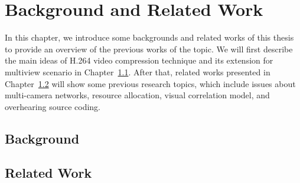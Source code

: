 \section{Background and Related Work}
\label{sec::backgroundAndRelatedWork}
In this chapter, we introduce some backgrounds and related works of this thesis to provide an overview of the previous works of the topic.
We will first describe the main ideas of H.264 video compression technique and its extension for multiview scenario in Chapter~\ref{sec::background}.
After that, related works presented in Chapter~\ref{sec::relatedWork} will show some previous research topics, which include issues about multi-camera networks, resource allocation, visual correlation model, and overhearing source coding.
%
\subsection{Background}
\label{sec::background}



%
\subsection{Related Work}
\label{sec::relatedWork}
